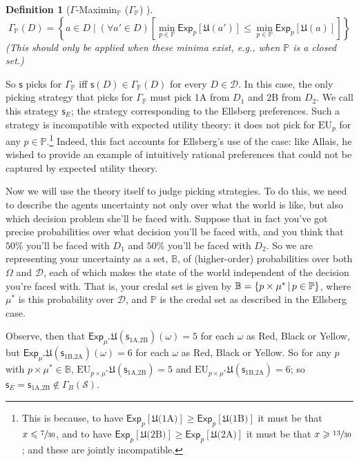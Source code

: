 \documentclass[a4paper]{article}
\newtheorem{definition}{Definition}
\newcommand\D{\mathcal{D}}
\renewcommand\S{\mathcal{S}}
\newcommand\s{\mathsf{s}}
\renewcommand\P{\mathbb{P}} %
\newcommand\Exp{\mathsf{Exp}}
\newcommand\EU{\mathrm{EU}}
\newcommand\U{\mathfrak{U}} %
\newcommand\Maximin{\Gamma}
\newcommand{\IB}{\mathbb{B}}
\newcommand{\IP}{\P}
\newcommand\SetDelimiter[1][]{
	\nonscript\,#1\vert \allowbreak \nonscript\,\mathopen{}}
\providecommand\given{\SetDelimiter}
\renewcommand{\leq}{\leqslant}
\renewcommand{\geq}{\geqslant}
\newenvironment{CCM rewritten}
{\begingroup\color{blue}} %
{\endgroup}              %
\begin{document}
\begin{definition}[$\Gamma$-Maximin$_\IP$ ($\Maximin_\IP$) ]
$$
\Maximin_\IP(D) = \left \{ a \in D \mid (\forall a' \in D)\left [\min_{p \in \IP} \Exp_p[\U(a')] \leq \min_{p \in \IP} \Exp_p[\U(a)] \right ] \right \}
$$
(This should only be applied when these minima exist, e.g., when $\IP$ is a closed set.)
\end{definition}

So $\s$ picks for $\Maximin_\IP$ iff $\s(D)\in\Maximin_\IP(D)$ for every $D\in\D$. In this case, the only picking strategy that picks for $\Maximin_\IP$ must pick 1A from $D_1$ and 2B from $D_2$. We call this strategy $\s_E$; the strategy corresponding to the Ellsberg preferences. Such a strategy is incompatible with expected utility theory: it does not pick for $\EU_p$ for any $p\in\IP$.\footnote{\label{ftnte:Ellsberg not EU}This is because, to have $\Exp_p[\U(\text{1A)}]\geq \Exp_p[\U(\text{1B)}]$ it must be that $x\leq \sfrac{7}{30}$, and to have  $\Exp_p[\U(\text{2B)}]\geq \Exp_p[\U(\text{2A)}]$ it must be that $x\geq \sfrac{13}{30}$; and these are jointly incompatible. } Indeed, this fact accounts for Ellsberg's use of the case: like Allais, he wished to provide an example of intuitively rational preferences that could not be captured by expected utility theory. 

Now we will use the theory itself to judge picking strategies. To do this, we need to describe the agents uncertainty not only over what the world is like, but also which decision problem she'll be faced with. 
Suppose that in fact you've got precise probabilities over what decision you'll be faced with, and you think that $50\%$ you'll be faced with $D_1$ and $50\%$ you'll be faced with $D_2$. 
So we are representing your uncertainty as a set, $\IB$, of (higher-order) probabilities over both $\Omega$ and $\D$, each of which makes the state of the world independent of the decision you're faced with. 
{That is, your credal set is given by $\IB=\{p\times\mu^* \given p\in\IP\}$, where $\mu^*$ is this probability over $\D$, and $\IP$ is the credal set as described in the Ellsberg case.}

Observe, then that $\Exp_{\mu^*}\U(\s_{\text{1A,2B}})(\omega)=5$ for each $\omega$ as Red, Black or Yellow, but $\Exp_{\mu^*}\U(\s_{\text{1B,2A}})(\omega)=6$ for each $\omega$ as Red, Black or Yellow. So for any $p$ with $p\times \mu^*\in \IB$,  $\EU_{p\times\mu^*}\U(\s_{\text{1A,2B}})=5$ and  $\EU_{p\times\mu^*}\U(\s_{\text{1B,2A}})=6$; so $\s_E=\s_{\text{1A,2B}}\notin\Maximin_B(\S)$. 
\end{document}
